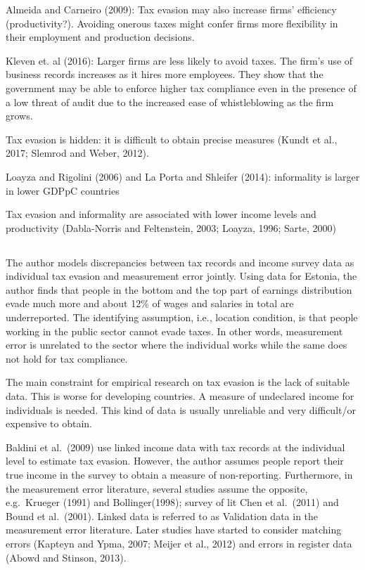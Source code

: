 \documentclass[
  12pt]{article}
\theoremstyle{definition}
\theoremstyle{remark}
\begin{document}
Almeida and Carneiro (2009): Tax evasion may also increase firms'
efficiency (productivity?). Avoiding onerous taxes might confer firms
more flexibility in their employment and production decisions.

Kleven et. al (2016): Larger firms are less likely to avoid taxes. The
firm's use of business records increases as it hires more employees.
They show that the government may be able to enforce higher tax
compliance even in the presence of a low threat of audit due to the
increased ease of whistleblowing as the firm grows.

Tax evasion is hidden: it is difficult to obtain precise measures (Kundt
et al., 2017; Slemrod and Weber, 2012).

Loayza and Rigolini (2006) and La Porta and Shleifer (2014): informality
is larger in lower GDPpC countries

Tax evasion and informality are associated with lower income levels and
productivity (Dabla-Norris and Feltenstein, 2003; Loayza, 1996; Sarte,
2000)

\subsection{\texorpdfstring{\citet{Paulus2015}}{@Paulus2015}}\label{paulus2015}

The author models discrepancies between tax records and income survey
data as individual tax evasion and measurement error jointly. Using data
for Estonia, the author finds that people in the bottom and the top part
of earnings distribution evade much more and about 12\% of wages and
salaries in total are underreported. The identifying assumption, i.e.,
location condition, is that people working in the public sector cannot
evade taxes. In other words, measurement error is unrelated to the
sector where the individual works while the same does not hold for tax
compliance.

The main constraint for empirical research on tax evasion is the lack of
suitable data. This is worse for developing countries. A measure of
undeclared income for individuals is needed. This kind of data is
usually unreliable and very difficult/or expensive to obtain.

Baldini et al.~(2009) use linked income data with tax records at the
individual level to estimate tax evasion. However, the author assumes
people report their true income in the survey to obtain a measure of
non-reporting. Furthermore, in the measurement error literature, several
studies assume the opposite, e.g.~Krueger (1991) and Bollinger(1998);
survey of lit Chen et al.~(2011) and Bound et al.~(2001). Linked data is
referred to as Validation data in the measurement error literature.
Later studies have started to consider matching errors (Kapteyn and
Ypma, 2007; Meijer et al., 2012) and errors in register data (Abowd and
Stinson, 2013).
\end{document}
